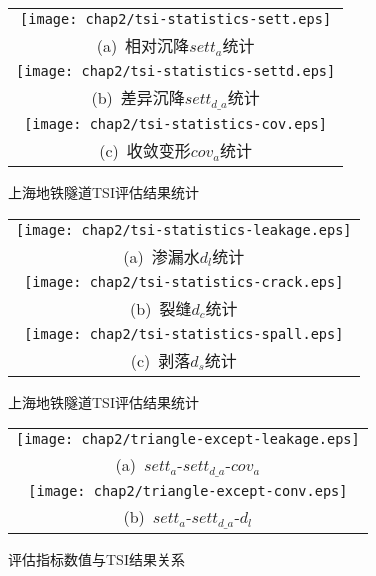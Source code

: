 \begin{figure}[htbp!] 
    \centering 
    \begin{tabular}{c} 
        \texttt{[image: chap2/tsi-statistics-sett.eps]} \\ 
        (a)~相对沉降${sett}_{a}$统计 \\
        \texttt{[image: chap2/tsi-statistics-settd.eps]} \\ 
        (b)~差异沉降$set{{t}_{d\_a}}$统计 \\
        \texttt{[image: chap2/tsi-statistics-cov.eps]} \\ 
        (c)~收敛变形${cov}_{a}$统计 \\
    \end{tabular}
    \caption{上海地铁隧道TSI评估结果统计} 
    \label{fig:上海地铁隧道TSI评估结果统计} 
\end{figure}

\begin{figure}[htbp!] 
    \centering 
    \begin{tabular}{c} 
        \texttt{[image: chap2/tsi-statistics-leakage.eps]} \\ 
        (a)~渗漏水$d_l$统计 \\
        \texttt{[image: chap2/tsi-statistics-crack.eps]} \\ 
        (b)~裂缝$d_c$统计 \\
        \texttt{[image: chap2/tsi-statistics-spall.eps]} \\ 
        (c)~剥落$d_s$统计 \\
    \end{tabular}
    \caption{上海地铁隧道TSI评估结果统计} 
    \label{fig:上海地铁隧道TSI评估结果统计2} 
\end{figure}

\begin{figure}[htbp!] 
    \centering 
    \begin{tabular}{c}
        \texttt{[image: chap2/triangle-except-leakage.eps]} \\ 
        (a)~${sett}_{a}$-$set{{t}_{d\_a}}$-$cov_a$ \\
        \texttt{[image: chap2/triangle-except-conv.eps]} \\ 
        (b)~${sett}_{a}$-$set{{t}_{d\_a}}$-$d_l$ \\
    \end{tabular}
    \caption{评估指标数值与TSI结果关系} 
    \label{fig:评估指标数值与TSI结果关系} 
\end{figure}

